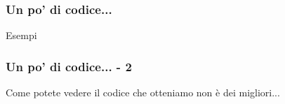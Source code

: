 \begin{frame}[fragile]
  \frametitle{Un po' di codice...}
  
  \begin{exampleblock}{Esempi}
    
  \end{exampleblock}
\end{frame}

\begin{frame}
 
 \frametitle{Un po' di codice... - 2}
 
 Come potete vedere il codice che otteniamo non è dei migliori...
\end{frame}
